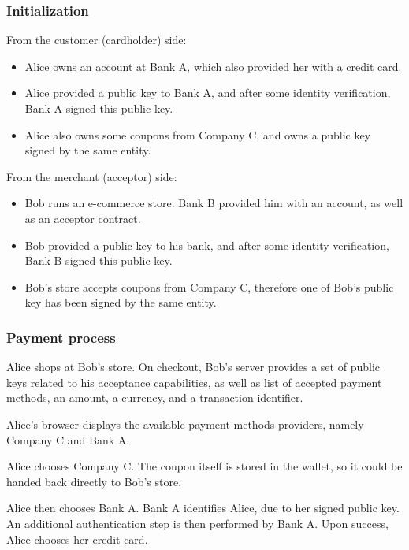 \subsubsection{Initialization}\label{initialization}

From the customer (cardholder) side:

\begin{itemize}
\item
  Alice owns an account at Bank A, which also provided her with a credit
  card.
\item
  Alice provided a public key to Bank A, and after some identity
  verification, Bank A signed this public key.
\item
  Alice also owns some coupons from Company C, and owns a public key
  signed by the same entity.
\end{itemize}

From the merchant (acceptor) side:

\begin{itemize}
\item
  Bob runs an e-commerce store. Bank B provided him with an account, as
  well as an acceptor contract.
\item
  Bob provided a public key to his bank, and after some identity
  verification, Bank B signed this public key.
\item
  Bob's store accepts coupons from Company C, therefore one of Bob's
  public key has been signed by the same entity.
\end{itemize}

\subsubsection{Payment process}\label{payment-process}

Alice shops at Bob's store. On checkout, Bob's server provides a set of
public keys related to his acceptance capabilities, as well as list of
accepted payment methods, an amount, a currency, and a transaction
identifier.

Alice's browser displays the available payment methods providers, namely
Company C and Bank A.

Alice chooses Company C. The coupon itself is stored in the wallet, so
it could be handed back directly to Bob's store.

Alice then chooses Bank A. Bank A identifies Alice, due to her signed
public key. An additional authentication step is then performed by Bank
A. Upon success, Alice chooses her credit card.

